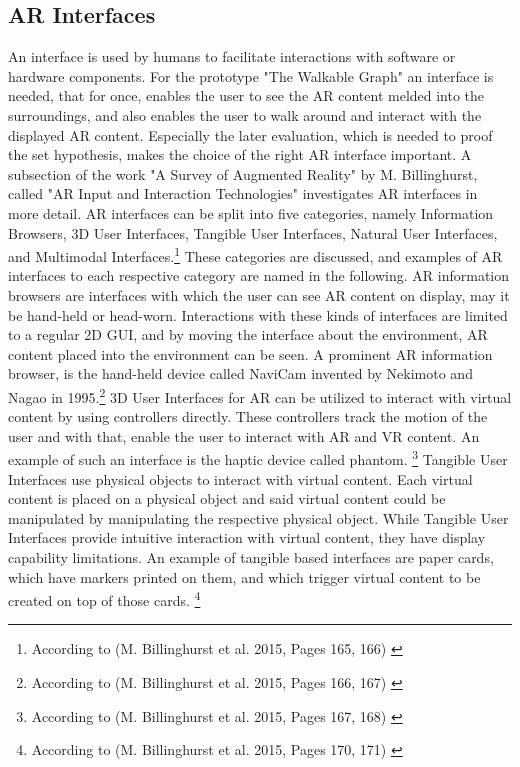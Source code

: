 \documentclass[12pt,a4paper,oneside,american,parskip=half]{article}
\begin{document}
\begin{justify}
\begin{normalsize}
\subsection{AR Interfaces}
An interface is used by humans to facilitate interactions with software or hardware components. For the prototype "The Walkable Graph" an interface is needed, that for once, enables the user to see the AR content melded into the surroundings, and also enables the user to walk around and interact with the displayed AR content. Especially the later evaluation, which is needed to proof the set hypothesis, makes the choice of the right AR interface important.
\newline
\newline
A subsection of the work "A Survey of Augmented Reality" by M. Billinghurst, called "AR Input and Interaction Technologies" investigates AR interfaces in more detail. AR interfaces can be split into five categories, namely Information Browsers, 3D User Interfaces, Tangible User Interfaces, Natural User Interfaces, and Multimodal Interfaces.\footnote{According to (M. Billinghurst et al. 2015, Pages 165, 166) \cite{interfaces}}
These categories are discussed, and examples of AR interfaces to each respective category are named in the following.
\newline
AR information browsers are interfaces with which the user can see AR content on display, may it be hand-held or head-worn. Interactions with these kinds of interfaces are limited to a regular 2D \ac{GUI}, and by moving the interface about the environment, AR content placed into the environment can be seen. A prominent AR information browser, is the hand-held device called NaviCam invented by Nekimoto and Nagao in 1995.\footnote{According to (M. Billinghurst et al. 2015, Pages 166, 167) \cite{interfaces}}
\newline
3D User Interfaces for AR can be utilized to interact with virtual content by using controllers directly. These controllers track the motion of the user and with that, enable the user to interact with AR and VR content. An example of such an interface is the haptic device called phantom.
\footnote{According to (M. Billinghurst et al. 2015, Pages 167, 168) \cite{interfaces}}
\newline
Tangible User Interfaces use physical objects to interact with virtual content. Each virtual content is placed on a physical object and said virtual content could be manipulated by manipulating the respective physical object. While Tangible User Interfaces provide intuitive interaction with virtual content, they have display capability limitations. An example of tangible based interfaces are paper cards, which have markers printed on them, and which trigger virtual content to be created on top of those cards. \footnote{According to (M. Billinghurst et al. 2015, Pages 170, 171) \cite{interfaces}}

\end{normalsize}
\end{justify}
\end{document}
